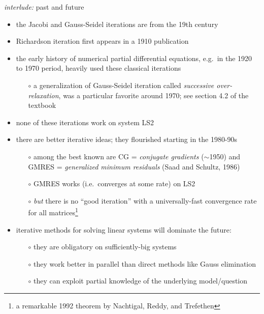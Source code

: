 \documentclass[10pt,hyperref]{beamer}
\begin{document}
\begin{frame}{\emph{interlude:} past and future}

\begin{itemize}
\item the Jacobi and Gauss-Seidel iterations are from the 19th century
\item Richardson iteration first appears in a 1910 publication
\item the early history of numerical partial differential equations, e.g.~in the 1920 to 1970 period, heavily used these classical iterations
  \begin{itemize}
  \item[$\circ$] a generalization of Gauss-Seidel iteration called \emph{successive over-relaxation}, was a particular favorite around 1970;  see section 4.2 of the textbook
  \end{itemize}
\item none of these iterations work on system LS2
\item there are better iterative ideas; they flourished starting in the 1980-90s
  \begin{itemize}
  \item[$\circ$] among the best known are CG = \emph{conjugate gradients} ($\sim$1950) and GMRES = \emph{generalized minimum residuals} (Saad and Schultz, 1986)
  \item[$\circ$] GMRES works (i.e.~converges at some rate) on LS2
  \item[$\circ$] \emph{but} there is no ``good iteration'' with a universally-fast convergence rate for all matrices\footnote{a remarkable 1992 theorem by Nachtigal, Reddy, and Trefethen}
  \end{itemize}
\item iterative methods for solving linear systems will dominate the future:
  \begin{itemize}
  \item[$\circ$] they are obligatory on sufficiently-big systems
  \item[$\circ$] they work better in parallel than direct methods like Gauss elimination
  \item[$\circ$] they can exploit partial knowledge of the underlying model/question
  \end{itemize}
\end{itemize}
\end{frame}
\end{document}
